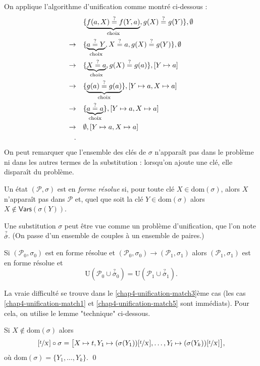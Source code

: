 \documentclass[../main]{subfiles}
\begin{document}
  \begin{exm}
    On applique l'algorithme d'unification comme montré ci-dessous :
    \begin{align*}
      &\quad\{\underbrace{f(a,X) \mathrel{\overset ? =} f(Y,a)}_{\text{choix}}, g(X) \mathrel{\overset ? =} g(Y)\}, \emptyset\\
      \to&\quad\{\underbrace{a \mathrel{\overset ? =} Y}_{\text{choix}}, X \mathrel{\overset ? =} a, g(X) \mathrel{\overset ? =} g(Y)\}, \emptyset\\
      \to&\quad\{\underbrace{X \mathrel{\overset ? =} a}_{\text{choix}}, g(X) \mathrel{\overset ? =} g(a)\}, [Y \mapsto a]\\
      \to&\quad\{\underbrace{g(a) \mathrel{\overset ? =} g(a)}_\text{choix}\}, [Y \mapsto a,X \mapsto a]\\
      \to&\quad\{\underbrace{a\mathrel{\overset ? =} a}_\text{choix}\}, [Y \mapsto a,X \mapsto a]\\
      \to&\quad\emptyset, [Y \mapsto a,X \mapsto a]\\
    .\end{align*}
    On peut remarquer que l'ensemble des clés de $\sigma$ n'apparaît pas dans le problème ni dans les autres termes de la substitution : lorsqu'on ajoute une clé, elle disparaît du problème.
  \end{exm}

  \begin{defn}
    Un état $(\mathcal{P}, \sigma)$ est en \textit{forme résolue} si, pour toute clé $X \in \mathrm{dom}(\sigma)$, alors $X$ n'apparaît pas dans $\mathcal{P}$ et, quel que soit la clé $Y \in \mathrm{dom}(\sigma)$ alors $X \not\in  \mathsf{Vars}(\sigma(Y))$.
  \end{defn}

  \begin{rmk}[Notation]
    Une substitution $\sigma$ peut être vue comme un problème d'unification, que l'on note $\overset ? \sigma$.
    (On passe d'un ensemble de couples à un ensemble de paires.)
  \end{rmk}

  \begin{prop}
    Si $(\mathcal{P}_0, \sigma_0)$ est en forme résolue et $(\mathcal{P}_0, \sigma_0) \to (\mathcal{P}_1, \sigma_1)$ alors $(\mathcal{P}_1, \sigma_1)$ est en forme résolue et \[
    \mathrm{U}(\mathcal{P}_0 \cup \overset ? \sigma_0) =
    \mathrm{U}(\mathcal{P}_1 \cup \overset ? \sigma_1)
    .\] 
  \end{prop}

  \begin{prv}
    La vraie difficulté se trouve dans le \ref{chap4-unification-match3}ème cas (les cas \ref{chap4-unification-match1} et \ref{chap4-unification-match5} sont immédiats).
    Pour cela, on utilise le lemme "technique" ci-dessous.

    \begin{lem}
      Si $X \not\in \mathrm{dom}(\sigma)$ alors \[
        [\sfrac{t}{X}] \circ \sigma = \big[X \mapsto t, Y_1 \mapsto (\sigma(Y_1))[\sfrac{t}{X}], \mathinner{\ldotp\ldotp\ldotp}, Y_l \mapsto (\sigma(Y_k))[\sfrac{t}{X}]\big]
      ,\] 
      où $\mathrm{dom}(\sigma) = \{Y_1, \ldots, Y_k\}$.
      \qed
    \end{lem}
  \end{prv}
\end{document}

